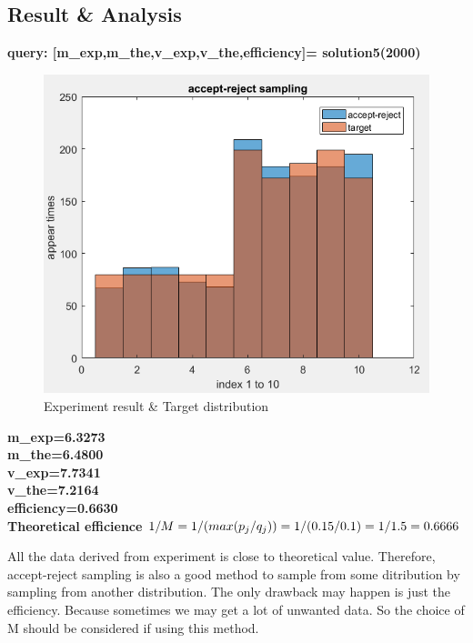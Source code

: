 \documentclass[twoside]{article}
\begin{document}
\subsection{\normalsize{Result \& Analysis}}
\noindent \textbf {query: [m\_exp,m\_the,v\_exp,v\_the,efficiency]= solution5(2000)}\\
\begin{multicols}{2}
\begin{figure}[H]
   \centering
   \includegraphics[width =0.5 \textwidth]{../data/solution5.png}  
   \caption{Experiment result \& Target distribution}
\end{figure}
\noindent \textbf {m\_exp=6.3273}\\
\noindent \textbf {m\_the=6.4800}\\
\noindent \textbf {v\_exp=7.7341}\\
\noindent \textbf {v\_the=7.2164}\\
\noindent \textbf {efficiency=0.6630}\\
\noindent \textbf {Theoretical efficience $1/M = 1/(max(p_j/q_j))=1/(0.15/0.1)=1/1.5=0.6666\\$}\\
\end{multicols}
All the data derived from experiment is close to theoretical value. Therefore, accept-reject sampling is also a good method to sample from some ditribution by sampling from another distribution. The only drawback may happen is just the efficiency. Because sometimes we may get a lot of unwanted data. So the choice of  M should be considered if using this method. 
\end{document}
